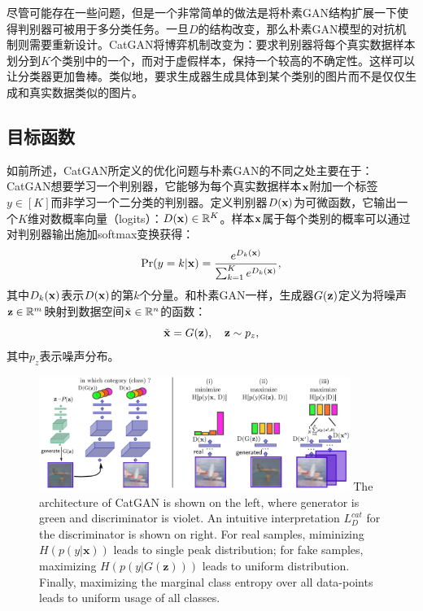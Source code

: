尽管可能存在一些问题，但是一个非常简单的做法是将朴素GAN结构扩展一下使得判别器可被用于多分类任务。一旦$D$的结构改变，那么朴素GAN模型的对抗机制则需要重新设计。CatGAN将博弈机制改变为：要求判别器将每个真实数据样本划分到$K$个类别中的一个，而对于虚假样本，保持一个较高的不确定性。这样可以让分类器更加鲁棒。类似地，要求生成器生成具体到某个类别的图片而不是仅仅生成和真实数据类似的图片。

\subsection{目标函数}
如前所述，CatGAN所定义的优化问题与朴素GAN的不同之处主要在于：CatGAN想要学习一个判别器，它能够为每个真实数据样本$\mathbf{x}$附加一个标签$y \in [K]$而非学习一个二分类的判别器。定义判别器$D(\mathbf{x})$为可微函数，它输出一个$K$维对数概率向量（logits）：$D(\mathbf{x}) \in \mathbb{R}^K$。样本$\mathbf{x}$属于每个类别的概率可以通过对判别器输出施加softmax变换获得：
\begin{equation}
  \Pr(y=k|\mathbf{x}) = \frac{e^{D_k(\mathbf{x})}}{\sum_{k=1}^K e^{D_k(\mathbf{x})}},
\end{equation}
其中$D_k(\mathbf{x})$表示$D(\mathbf{x})$的第$k$个分量。和朴素GAN一样，生成器$G(\mathbf{z})$定义为将噪声$\mathbf{z} \in \mathbb{R}^m$映射到数据空间$\tilde{\mathbf{x}} \in \mathbb{R}^n$的函数：
\begin{equation}
  \tilde{\mathbf{x}} = G(\mathbf{z}), \quad \mathbf{z} \sim p_z,
\end{equation}
其中$p_z$表示噪声分布。

\begin{figure}[hbtp]
  \centering
  \includegraphics[width=0.9\textwidth]{Img/arch-catgan.png}
  {The architecture of CatGAN is shown on the left, where generator is green and discriminator is violet. An intuitive interpretation $L_D^{cat}$ for the discriminator is shown on right. For real samples, miminizing $H(p(y|\mathbf{x}))$ leads to single peak distribution; for fake samples, maximizing $H(p(y|G(\mathbf{z})))$ leads to uniform distribution. Finally, maximizing the marginal class entropy over all data-points leads to uniform usage of all classes.}
  \label{fig:arch-catgan}
\end{figure}

